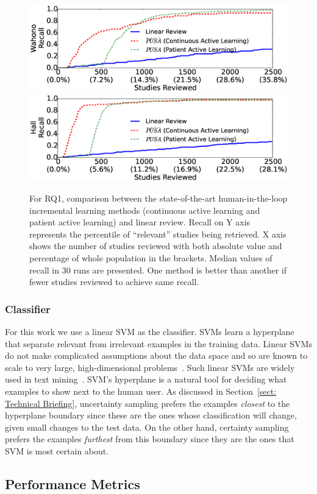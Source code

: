 \documentclass[final,twocolumn,5p]{elsarticle}
\theoremstyle{break}
\begin{document}
\begin{figure}[t]
    \centering
    \includegraphics[width=0.48\linewidth]{IST_B_Wahono.eps}
    \includegraphics[width=0.48\linewidth]{IST_B_Hall.eps}
    \caption{For RQ1, comparison between the state-of-the-art human-in-the-loop incremental learning methods (continuous active learning and patient active learning) and linear review. Recall on Y axis represents the percentile of ``relevant'' studies being retrieved. X axis shows the number of studies reviewed with both absolute value and percentage of whole population in the brackets. Median values of recall in $30$ runs are presented. One method is better than another if fewer studies reviewed to achieve same recall.}
    \label{fig:baselines}
\end{figure}

\subsubsection{Classifier}

For this work we use a
linear SVM as the classifier.
SVMs learn a hyperplane that separate relevant from irrelevant examples
in the training data.
Linear SVMs do not make complicated assumptions about the data space
and so are known to scale to very large, high-dimensional
problems~\cite{joachims2006training}. Such linear SVMs are widely used in text
mining~\cite{krishna2016bigse}.
SVM's hyperplane is a natural tool for deciding what examples
to show next to the human user. As discussed in Section~\ref{sect: Technical Briefing}, uncertainty sampling prefers the examples
{\em closest} to the hyperplane boundary since these are the ones whose classification will
change, given small changes to the test data.
On the other hand, certainty sampling prefers
the examples {\em furthest} from this boundary since they are the ones that SVM is most certain about. 




\subsection{Performance Metrics}
\label{subsect: Performance Metrics}
\end{document}
